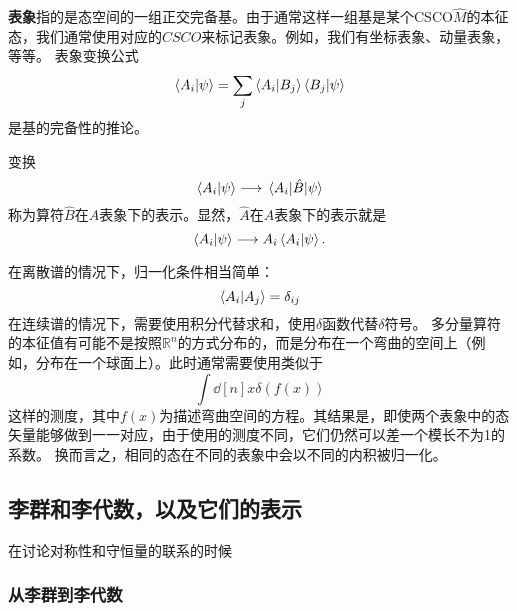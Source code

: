 \documentclass[hyperref, UTF8, a4paper]{ctexart}
\newcommand*{\reals}{\mathbb{R}}
\begin{document}
\textbf{表象}指的是态空间的一组正交完备基。由于通常这样一组基是某个CSCO$\hat{M}$的本征态，我们通常使用对应的$CSCO$来标记表象。例如，我们有坐标表象、动量表象，等等。
表象变换公式
\begin{equation}
    \braket{A_i}{\psi} = \sum_j \braket{A_i}{B_j} \braket{B_j}{\psi}
\end{equation}
是基的完备性的推论。

变换
\[
    \braket{A_i}{\psi} \longrightarrow \mel{A_i}{\hat{B}}{\psi}
\]
称为算符$\hat{B}$在$A$表象下的表示。显然，$\hat{A}$在$A$表象下的表示就是
\[
    \braket{A_i}{\psi} \longrightarrow A_i \braket{A_i}{\psi}.
\]

在离散谱的情况下，归一化条件相当简单：
\[
    \braket{A_i}{A_j} = \delta_{ij}
\]
在连续谱的情况下，需要使用积分代替求和，使用$\delta$函数代替$\delta$符号。
多分量算符的本征值有可能不是按照$\reals^n$的方式分布的，而是分布在一个弯曲的空间上（例如，分布在一个球面上）。此时通常需要使用类似于
\[
    \int \dd[n]{x} \delta(f(x))
\]
这样的测度，其中$f(x)$为描述弯曲空间的方程。其结果是，即使两个表象中的态矢量能够做到一一对应，由于使用的测度不同，它们仍然可以差一个模长不为1的系数。
换而言之，相同的态在不同的表象中会以不同的内积被归一化。

\subsection{李群和李代数，以及它们的表示}
在讨论对称性和守恒量的联系的时候

\subsubsection{从李群到李代数}
\end{document}
